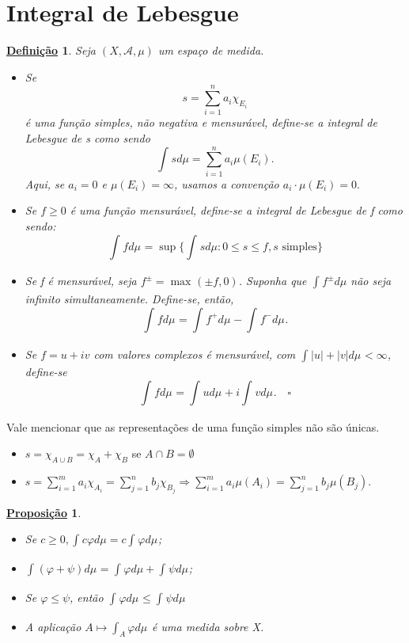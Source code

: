 \documentclass{article}
\newtheorem*{def*}{\underline{Defini\c c\~ao}}
\newtheorem*{prop*}{\underline{Proposi\c c\~ao}}
\begin{document}
\section{Integral de Lebesgue}
\begin{def*}
  Seja \((X, \mathcal{A}, \mu )\) um espaço de medida. 
 \begin{itemize}
   \item[1)] Se 
     \[
       s=\sum\limits_{i=1}^{n}a_{i}\chi_{E_{i}}
     \]
     é uma função simples, não negativa e mensurável, define-se a integral de Lebesgue de s como sendo 
       \[
         \int_{}^{}sd\mu = \sum\limits_{i=1}^{n}a_{i}\mu (E_{i}).
       \]
      Aqui, se \(a_{i} = 0\) e \(\mu (E_{i}) = \infty\), usamos a convenção \(a_{i}\cdot \mu (E_{i}) =0.\)
  \item[2)] Se \(f\geq 0\) é uma função mensurável, define-se a integral de Lebesgue de f como sendo:
    \[
      \int_{}f d\mu_{} = \sup_{}\biggl\{\int_{}^{}s d\mu : 0 \leq s\leq f, s \text{ simples}\biggr\}
    \]
  \item[3)] Se f é mensurável, seja \(f^{\pm} = \max_{}(\pm f, 0)\). Suponha que \(\int_{}^{}f^{\pm}d\mu \) não seja infinito simultaneamente. Define-se, então, 
    \[
      \int_{}f d\mu_{} = \int_{}f^{+} d\mu_{} - \int_{}f^{-} d\mu_{}.
    \]
  \item[4)] Se \(f = u + iv\) com valores complexos é mensurável, com \(\int_{}|u|+|v| d\mu_{} < \infty\), define-se
    \[
      \int_{}f d\mu_{} = \int_{}u d\mu_{} + i\int_{}v d\mu_{}. \quad \square
    \]
 \end{itemize}
\end{def*}
  Vale mencionar que as representações de uma função simples não são únicas.
 \begin{itemize}
   \item \(s = \chi_{A\cup B} = \chi_{A} + \chi_{B}\) se \(A\cap B = \emptyset \)
   \item \(s = \sum\limits_{i=1}^{m}a_{i}\chi_{A_{i}} = \sum\limits_{j=1}^{n}b_{j}\chi_{B_{j}} \Rightarrow \sum\limits_{i=1}^{m}a_{i}\mu (A_{i}) = \sum\limits_{j=1}^{n}b_{j}\mu (B_{j})\).
 \end{itemize}
 \begin{prop*}
  \begin{itemize}
    \item[1)] Se \(c\geq 0, \int_{}^{}c\varphi d\mu  = c\int_{}\varphi  d\mu_{}\);
      \item[2)] \(\int_{}(\varphi + \psi) d\mu_{} = \int_{}^{}\varphi d\mu + \int_{}\psi d\mu_{}\);
        \item[3)] Se \(\varphi \leq \psi\), então \(\int_{}\varphi  d\mu_{} \leq \int_{}\psi d\mu_{}\)
          \item[4)] A aplicação \(A\mapsto \int_{A}\varphi  d\mu_{}\) é uma medida sobre X. 
  \end{itemize}
 \end{prop*}
\end{document}
